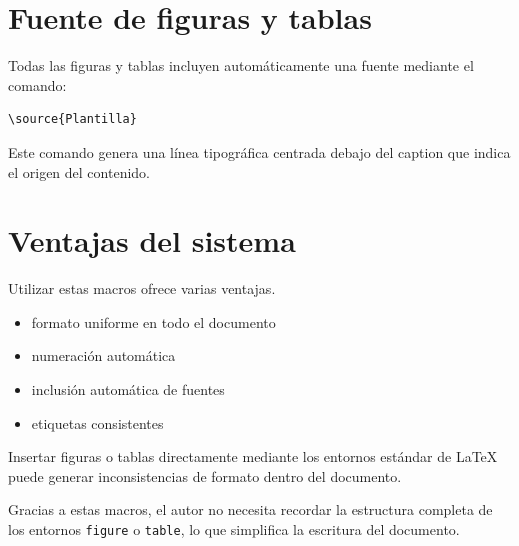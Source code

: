 


\section{Fuente de figuras y tablas}

Todas las figuras y tablas incluyen automáticamente
una fuente mediante el comando:

\begin{lstlisting}[caption={Macro de fuente},label={code:source}]
\source{Plantilla}
\end{lstlisting}


Este comando genera una línea tipográfica centrada
debajo del caption que indica el origen del contenido.




\section{Ventajas del sistema}

Utilizar estas macros ofrece varias ventajas.

\begin{itemize}

\item formato uniforme en todo el documento
\item numeración automática
\item inclusión automática de fuentes
\item etiquetas consistentes

\end{itemize}



\begin{warningbox}
Insertar figuras o tablas directamente mediante
los entornos estándar de \LaTeX{} puede generar
inconsistencias de formato dentro del documento.
\end{warningbox}



\begin{examplebox}
Gracias a estas macros, el autor no necesita recordar
la estructura completa de los entornos \texttt{figure}
o \texttt{table}, lo que simplifica la escritura del
documento.
\end{examplebox}
